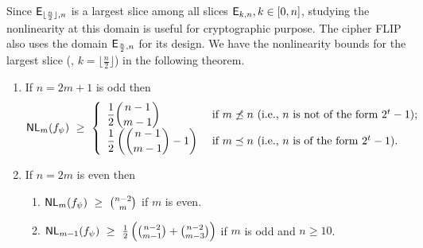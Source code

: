 \documentclass{llncs}
\begin{document}
Since $\mathsf{E}_{\lfloor\frac{n}{2}\rfloor,n}$ is a largest slice among all slices $\mathsf{E}_{k,n}, k \in [0,n]$, studying the nonlinearity at this domain is useful for cryptographic purpose. The cipher FLIP also uses the domain $\mathsf{E}_{\frac{n}{2},n}$ for its design. We have the nonlinearity bounds for the largest slice (\ie, $k = \lfloor\frac{n}{2}\rfloor$) in the following theorem.
\begin{theorem}\label{thm:NLk_boundm}
\begin{enumerate}
\item If $n = 2m+1$ is odd then
$$\mathsf{NL}_{m}(f_\psi) ~\geq ~ 
\left\{ \begin{array}{ll}
\displaystyle{\frac{1}{2}{n-1 \choose m-1}}  & \text{ if }  m \not\preceq n ~(\text{i.e., } n \text{ is not of the form } 2^t-1); \\
\displaystyle{\frac{1}{2}\left({n-1 \choose m-1} - 1\right)} & \text{ if } m \preceq n ~(\text{i.e., } n \text{ is of the form } 2^t-1).
\end{array}  \right.$$
\item If $n = 2m$ is even then 
\begin{enumerate}
 \item $\mathsf{NL}_{m}(f_\psi) ~\geq ~ {n-2 \choose m}$ if $m$ is even.
 \item $\mathsf{NL}_{m-1}(f_\psi) ~\geq ~ \frac{1}{2}\left({n-2 \choose m-1} + {n-2 \choose m-3}\right)$ if $m$ is odd and $n \geq 10$.
\end{enumerate}
\end{enumerate}
\end{theorem}

\end{document}
